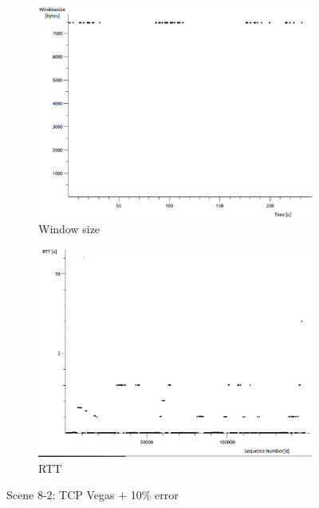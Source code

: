 \documentclass[conference,a4paper]{../../sty/IEEEtran}
\begin{document}
\begin{figure}
\begin{subfigure}[b]{0.2\textwidth}
  \includegraphics[width=\textwidth]{s8-2_wsize}
  \caption{Window size}
 \end{subfigure}
 \begin{subfigure}[b]{0.2\textwidth}
  \includegraphics[width=\textwidth]{s8-2_rtt}
  \caption{RTT}
 \end{subfigure}
 \caption{Scene 8-2: TCP Vegas + 10\% error}
\end{figure}
\end{document}
